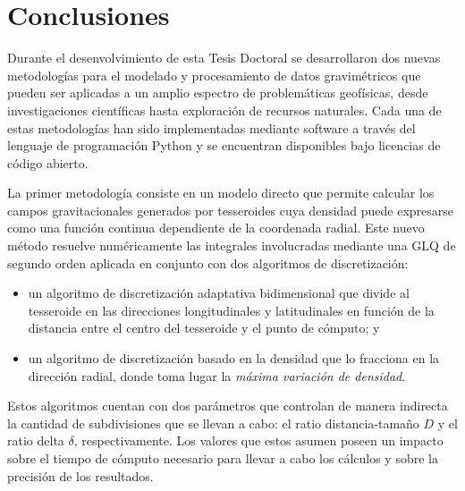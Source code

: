\chapter{Conclusiones}

Durante el desenvolvimiento de esta Tesis Doctoral se desarrollaron dos nuevas
metodologías para el modelado y procesamiento de datos gravimétricos que pueden
ser aplicadas a un amplio espectro de problemáticas geofísicas,
desde investigaciones científicas hasta exploración de recursos
naturales.
Cada una de estas metodologías han sido implementadas mediante software
a través del lenguaje de programación Python y se encuentran disponibles bajo
licencias de código abierto.

\vspace{1em}

La primer metodología consiste en un modelo directo que permite calcular los
campos gravitacionales generados por tesseroides cuya densidad puede expresarse
como una función continua dependiente de la coordenada radial.
Este nuevo método resuelve numéricamente las integrales involucradas mediante
una \acl{GLQ} de segundo orden aplicada en conjunto con dos algoritmos de
discretización:

\begin{itemize}
    \item un algoritmo de discretización adaptativa bidimensional que divide al
        tesseroide en las direcciones longitudinales y latitudinales en función
        de la distancia entre el centro del tesseroide y el punto de cómputo; y
    \item  un algoritmo de discretización basado en la densidad que lo
        fracciona en la dirección radial, donde toma lugar la \emph{máxima
        variación de densidad}.
\end{itemize}

Estos algoritmos cuentan con dos parámetros que controlan de manera indirecta
la cantidad de subdivisiones que se llevan a cabo: el ratio distancia-tamaño
$D$ y el ratio delta $\delta$, respectivamente.
Los valores que estos asumen poseen un impacto sobre el tiempo de cómputo
necesario para llevar a cabo los cálculos y sobre la precisión de los
resultados.

